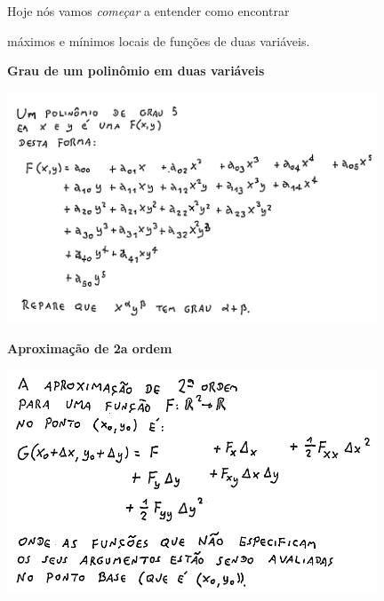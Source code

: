 \documentclass[oneside,12pt]{article}
\begin{document}
Hoje nós vamos {\sl começar} a entender como encontrar

máximos e mínimos locais de funções de duas variáveis.



\newpage

{\bf Grau de um polinômio em duas variáveis}

\includegraphics[width=11cm]{2020-1-C3/20201125_114928_poli_grau_5.pdf}

\newpage

{\bf Aproximação de 2a ordem}

\includegraphics[width=11cm]{2020-1-C3/20201125_115033_aprox_2a_ordem.pdf}

\newpage

\end{document}
